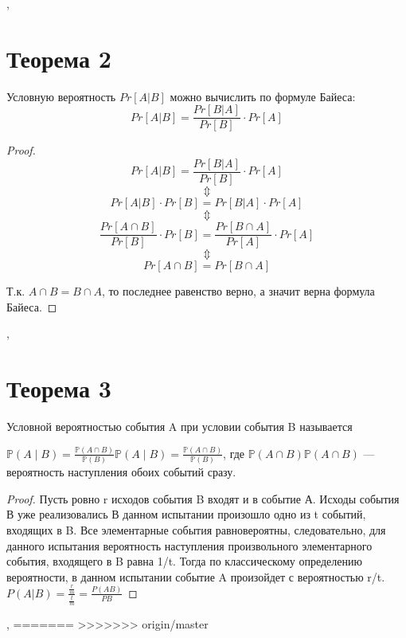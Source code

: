 \documentclass[a4paper,12pt]{article}
\begin{document}
    \sep
    \section{Теорема 2}
    \begin{theorem}
        Условную вероятность $Pr[A|B]$ можно вычислить по формуле Байеса: 
        $$ Pr[A|B] = \frac{Pr[B|A]}{Pr[B]} \cdot Pr[A]$$
    \end{theorem}
    
    \begin{proof}
        $$ Pr[A|B] = \frac{Pr[B|A]}{Pr[B]} \cdot Pr[A] $$
        $$\Updownarrow$$
        $$ Pr[A|B] \cdot Pr[B] = Pr[B|A] \cdot Pr[A] $$
        $$\Updownarrow$$
        $$ \frac{Pr[A\cap B]}{Pr[B]} \cdot Pr[B] = \frac{Pr[B\cap A]}{Pr[A]} \cdot Pr[A] $$
        $$\Updownarrow$$
        $$Pr[A\cap B] = Pr[B\cap A]$$
        
        Т.к. $A\cap B = B\cap A$, то последнее равенство верно, а значит верна формула Байеса. 
    \end{proof}
    \sep
    \section {Теорема 3}
    \begin{theorem}
   Условной вероятностью события A при условии события B называется

${\displaystyle \mathbb {P} (A\mid B)={\frac {\mathbb {P} (A\cap B)}{\mathbb {P} (B)}}} \mathbb{P}(A \mid B) = \frac{\mathbb{P}(A\cap B)}{\mathbb{P}(B)}$, где ${\displaystyle \mathbb {P} (A\cap B)} {\displaystyle \mathbb {P} (A\cap B)}$ — вероятность наступления обоих событий сразу.
    \end{theorem}
    \begin{proof}
    Пусть ровно r исходов события B входят и в событие А. Исходы события В уже реализовались
    В данном испытании произошло одно из t событий, входящих в B. Все элементарные события равновероятны, следовательно, для данного испытания вероятность наступления произвольного элементарного события, входящего в B равна 1/t. Тогда по классическому определению вероятности, в данном испытании событие A произойдет с вероятностью r/t.
    $P(A|B) = \frac{\frac{r}{m}}{\frac{t}{m}} = \frac{P(AB)}{P{B}}$

    
    \end{proof}
    \sep
=======
>>>>>>> origin/master
\end{document}
